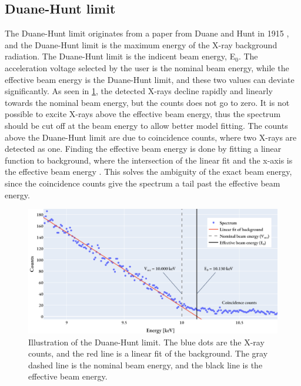 


\subsection{Duane-Hunt limit}
\label{theory:qc:duanehunt}

The Duane-Hunt limit originates from a paper from Duane and Hunt in 1915 \cite{Duane_Hunt_1915}, and the Duane-Hunt limit is the maximum energy of the X-ray background radiation.
The Duane-Hunt limit is the indicent beam energy, E$_0$. 
The acceleration voltage selected by the user is the nominal beam energy, while the effective beam energy is the Duane-Hunt limit, and these two values can deviate significantly.
As seen in \cref{fig:duanehunt}, the detected X-rays decline rapidly and linearly towards the nominal beam energy, but the counts does not go to zero.
It is not possible to excite X-rays above the effective beam energy, thus the spectrum should be cut off at the beam energy to allow better model fitting.
The counts above the Duane-Hunt limit are due to coincidence counts, where two X-rays are detected as one.
Finding the effective beam energy is done by fitting a linear function to background, where the intersection of the linear fit and the x-axis is the effective beam energy \cite{software_dtsaii} \cite[Ch. 9.1.3]{goldstein_scanning_2018}.
This solves the ambiguity of the exact beam energy, since the coincidence counts give the spectrum a tail past the effective beam energy.

\begin{figure}[ht]
    \centering
    \includegraphics[width=0.8\linewidth]{figures/Duane-Hunt.png}
    \caption{
        Illustration of the Duane-Hunt limit.
        The blue dots are the X-ray counts, and the red line is a linear fit of the background.
        The gray dashed line is the nominal beam energy, and the black line is the effective beam energy.
    }
    \label{fig:duanehunt}
\end{figure}

